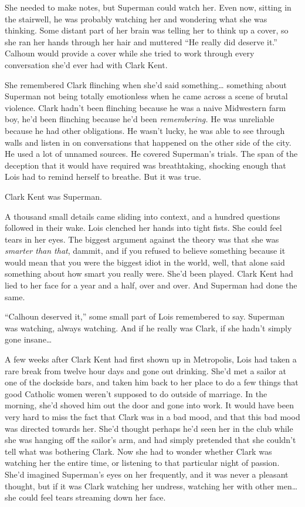 \documentclass[ebook,12pt]{memoir}
\begin{document}
She needed to make notes, but Superman could watch her. Even now,
sitting in the stairwell, he was probably watching her and wondering
what she was thinking. Some distant part of her brain was telling her to
think up a cover, so she ran her hands through her hair and muttered
``He really did deserve it.'' Calhoun would provide a cover while she
tried to work through every conversation she'd ever had with Clark Kent.

She remembered Clark flinching when she'd said something\ldots{}
something about Superman not being totally emotionless when he came
across a scene of brutal violence. Clark hadn't been flinching because
he was a naive Midwestern farm boy, he'd been flinching because he'd
been \emph{remembering.} He was unreliable because he had other
obligations. He wasn't lucky, he was able to see through walls and
listen in on conversations that happened on the other side of the city.
He used a lot of unnamed sources. He covered Superman's trials. The span
of the deception that it would have required was breathtaking, shocking
enough that Lois had to remind herself to breathe. But it was true.

Clark Kent was Superman.

A thousand small details came sliding into context, and a hundred
questions followed in their wake. Lois clenched her hands into tight
fists. She could feel tears in her eyes. The biggest argument against
the theory was that she was \emph{smarter than that}, dammit, and if you
refused to believe something because it would mean that you were the
biggest idiot in the world, well, that alone said something about how
smart you really were. She'd been played. Clark Kent had lied to her
face for a year and a half, over and over. And Superman had done the
same.

``Calhoun deserved it,'' some small part of Lois remembered to say.
Superman was watching, always watching. And if he really was Clark, if
she hadn't simply gone insane\ldots{}

A few weeks after Clark Kent had first shown up in Metropolis, Lois had
taken a rare break from twelve hour days and gone out drinking. She'd
met a sailor at one of the dockside bars, and taken him back to her
place to do a few things that good Catholic women weren't supposed to do
outside of marriage. In the morning, she'd shoved him out the door and
gone into work. It would have been very hard to miss the fact that Clark
was in a bad mood, and that this bad mood was directed towards her.
She'd thought perhaps he'd seen her in the club while she was hanging
off the sailor's arm, and had simply pretended that she couldn't tell
what was bothering Clark. Now she had to wonder whether Clark was
watching her the entire time, or listening to that particular night of
passion. She'd imagined Superman's eyes on her frequently, and it was
never a pleasant thought, but if it was Clark watching her undress,
watching her with other men\ldots{} she could feel tears streaming down
her face.
\end{document}

